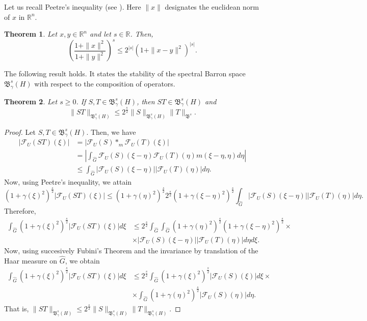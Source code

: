 \documentclass[11pt,a4paper]{amsart}
\newtheorem{theorem}{Theorem}[section]
\begin{document}
Let us recall Peetre's inequality (see \cite{Barros}). Here $\|x\|$ designates the euclidean  norm of $x$ in $\mathbb{R}^n$.
\begin{theorem}
Let $x,y\in \mathbb{R}^n$ and let $s\in \mathbb{R}$. Then, 
$$\left(\frac{1+\|x\|^2}{1+\|y\|^2}\right)^s\leq 2^{|s|}(1+\|x-y\|^2)^{|s|}.$$
\end{theorem}
\vspace{1cm}

 The following result holds. It states the stability of the spectral Barron space $\mathfrak{B}^s_\gamma(H)$  with respect to the composition of operators. 

\begin{theorem}
Let $s\geq 0$. If $S,T\in \mathfrak{B}^s_\gamma(H)$, then $ST \in \mathfrak{B}^s_\gamma(H)$ and 
$$\|ST\|_{\mathfrak{B}^s_\gamma(H)}\leq 2^{\frac{s}{2}}\|S\|_{\mathfrak{B}^s_\gamma(H)} \|T\|_{\mathfrak{B}^{s}}.$$
\end{theorem}

\begin{proof}
Let $S,T\in \mathfrak{B}^s_\gamma(H)$. Then, we have 
\begin{align*}
|\mathcal{F}_U(ST)(\xi)|&=\left|\mathcal{F}_U(S) \ast_m\mathcal{F}_U(T)(\xi)\right|\\
&=\left|\int_{\widehat{G}}\mathcal{F}_U(S)(\xi-\eta)\mathcal{F}_U(T)(\eta)m(\xi-\eta,\eta)d\eta\right|\\
&\leq \int_{\widehat{G}}|\mathcal{F}_U(S)(\xi-\eta)||\mathcal{F}_U(T)(\eta)|d\eta. 
\end{align*}
Now, using Peetre's inequality, we attain
$$(1+\gamma(\xi)^2)^{\frac{s}{2}}|\mathcal{F}_U(ST)(\xi)|\leq (1+\gamma(\eta)^2)^{\frac{s}{2}} 2^{\frac{s}{2}}(1+\gamma(\xi-\eta)^2)^{\frac{s}{2}}\int_{\widehat{G}}|\mathcal{F}_U(S)(\xi-\eta)||\mathcal{F}_U(T)(\eta)|d\eta.$$
Therefore, 
\begin{align*}
\int_{\widehat{G}}(1+\gamma(\xi)^2)^{\frac{s}{2}}|\mathcal{F}_U(ST)(\xi)|d\xi &\leq 2^{\frac{s}{2}}\int_{\widehat{G}}\int_{\widehat{G}}(1+\gamma(\eta)^2)^{\frac{s}{2}} (1+\gamma(\xi-\eta)^2)^{\frac{s}{2}}\times \\
&\times |\mathcal{F}_U(S)(\xi-\eta)||\mathcal{F}_U(T)(\eta)|d\eta d\xi.
\end{align*}
Now, using succesively Fubini's Theorem and the invariance by translation of the Haar measure on $\widehat{G}$, we obtain
\begin{align*}
\int_{\widehat{G}}(1+\gamma(\xi)^2)^{\frac{s}{2}}|\mathcal{F}_U(ST)(\xi)|d\xi &\leq 2^{\frac{s}{2}}\int_{\widehat{G}}(1+\gamma(\xi)^2)^{\frac{s}{2}}|\mathcal{F}_U(S)(\xi)|d\xi\times\\
&\times \int_{\widehat{G}}(1+\gamma(\eta)^2)^{\frac{s}{2}}|\mathcal{F}_U(S)(\eta)|d\eta.
\end{align*}
That is, $ \|ST\|_{\mathfrak{B}^s_\gamma(H)}\leq 2^{\frac{s}{2}}\|S\|_{\mathfrak{B}^s_\gamma(H)} \|T\|_{\mathfrak{B}^s_\gamma(H)}$.
\end{proof}
\end{document}
